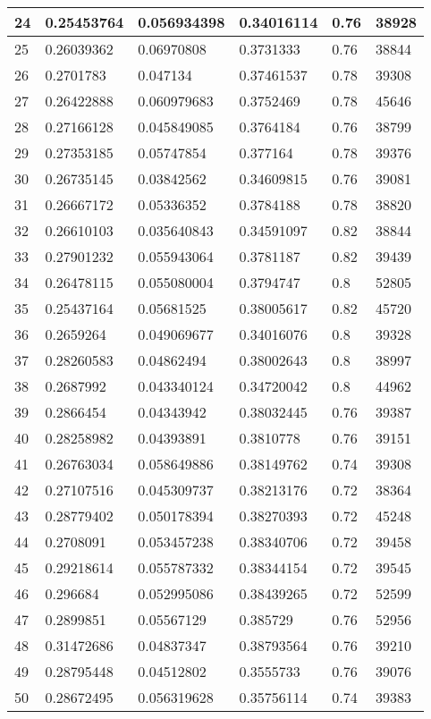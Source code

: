 \begin{longtable}{|l|l|l|l|l|l|}
24 & 0.25453764 & 0.056934398 & 0.34016114 & 0.76 & 38928 \\ \hline 
25 & 0.26039362 & 0.06970808 & 0.3731333 & 0.76 & 38844 \\ \hline 
26 & 0.2701783 & 0.047134 & 0.37461537 & 0.78 & 39308 \\ \hline 
27 & 0.26422888 & 0.060979683 & 0.3752469 & 0.78 & 45646 \\ \hline 
28 & 0.27166128 & 0.045849085 & 0.3764184 & 0.76 & 38799 \\ \hline 
29 & 0.27353185 & 0.05747854 & 0.377164 & 0.78 & 39376 \\ \hline 
30 & 0.26735145 & 0.03842562 & 0.34609815 & 0.76 & 39081 \\ \hline 
31 & 0.26667172 & 0.05336352 & 0.3784188 & 0.78 & 38820 \\ \hline 
32 & 0.26610103 & 0.035640843 & 0.34591097 & 0.82 & 38844 \\ \hline 
33 & 0.27901232 & 0.055943064 & 0.3781187 & 0.82 & 39439 \\ \hline 
34 & 0.26478115 & 0.055080004 & 0.3794747 & 0.8 & 52805 \\ \hline 
35 & 0.25437164 & 0.05681525 & 0.38005617 & 0.82 & 45720 \\ \hline 
36 & 0.2659264 & 0.049069677 & 0.34016076 & 0.8 & 39328 \\ \hline 
37 & 0.28260583 & 0.04862494 & 0.38002643 & 0.8 & 38997 \\ \hline 
38 & 0.2687992 & 0.043340124 & 0.34720042 & 0.8 & 44962 \\ \hline 
39 & 0.2866454 & 0.04343942 & 0.38032445 & 0.76 & 39387 \\ \hline 
40 & 0.28258982 & 0.04393891 & 0.3810778 & 0.76 & 39151 \\ \hline 
41 & 0.26763034 & 0.058649886 & 0.38149762 & 0.74 & 39308 \\ \hline 
42 & 0.27107516 & 0.045309737 & 0.38213176 & 0.72 & 38364 \\ \hline 
43 & 0.28779402 & 0.050178394 & 0.38270393 & 0.72 & 45248 \\ \hline 
44 & 0.2708091 & 0.053457238 & 0.38340706 & 0.72 & 39458 \\ \hline 
45 & 0.29218614 & 0.055787332 & 0.38344154 & 0.72 & 39545 \\ \hline 
46 & 0.296684 & 0.052995086 & 0.38439265 & 0.72 & 52599 \\ \hline 
47 & 0.2899851 & 0.05567129 & 0.385729 & 0.76 & 52956 \\ \hline 
48 & 0.31472686 & 0.04837347 & 0.38793564 & 0.76 & 39210 \\ \hline 
49 & 0.28795448 & 0.04512802 & 0.3555733 & 0.76 & 39076 \\ \hline 
50 & 0.28672495 & 0.056319628 & 0.35756114 & 0.74 & 39383 \\ \hline 
\end{longtable}